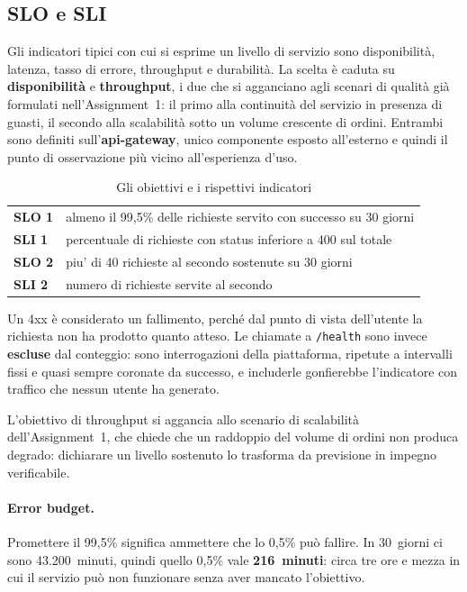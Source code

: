 \documentclass[12pt,a4paper]{article}
\begin{document}
\subsection{SLO e SLI}

Gli indicatori tipici con cui si esprime un livello di servizio sono disponibilit\`a, latenza,
tasso di errore, throughput e durabilit\`a. La scelta \`e caduta su \textbf{disponibilit\`a} e
\textbf{throughput}, i due che si agganciano agli scenari di qualit\`a gi\`a formulati
nell'Assignment~1: il primo alla continuit\`a del servizio in presenza di guasti, il secondo alla
scalabilit\`a sotto un volume crescente di ordini. Entrambi sono definiti sull'\textbf{api-gateway},
unico componente esposto all'esterno e quindi il punto di osservazione pi\`u vicino all'esperienza
d'uso.

\begin{table}[H]
\centering
\caption{Gli obiettivi e i rispettivi indicatori}
\begin{tabularx}{\textwidth}{lX}
\toprule
\textbf{SLO 1} & almeno il 99,5\% delle richieste servito con successo su 30 giorni \\
\textbf{SLI 1} & percentuale di richieste con status inferiore a 400 sul totale \\
\midrule
\textbf{SLO 2} & piu' di 40 richieste al secondo sostenute su 30 giorni \\
\textbf{SLI 2} & numero di richieste servite al secondo \\
\bottomrule
\end{tabularx}
\end{table}

Un 4xx \`e considerato un fallimento, perch\'e dal punto di vista dell'utente la richiesta non ha
prodotto quanto atteso. Le chiamate a \texttt{/health} sono invece \textbf{escluse} dal conteggio:
sono interrogazioni della piattaforma, ripetute a intervalli fissi e quasi sempre coronate da
successo, e includerle gonfierebbe l'indicatore con traffico che nessun utente ha generato.

L'obiettivo di throughput si aggancia allo scenario di scalabilit\`a dell'Assignment~1, che chiede
che un raddoppio del volume di ordini non produca degrado: dichiarare un livello sostenuto lo
trasforma da previsione in impegno verificabile.

\paragraph{Error budget.} Promettere il 99,5\% significa ammettere che lo 0,5\% pu\`o fallire. In
30~giorni ci sono 43.200~minuti, quindi quello 0,5\% vale \textbf{216~minuti}: circa tre ore e mezza
in cui il servizio pu\`o non funzionare senza aver mancato l'obiettivo.
\end{document}
